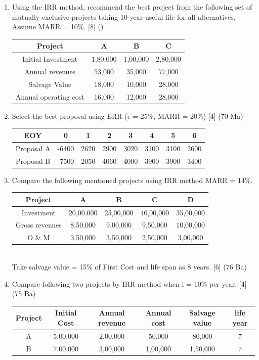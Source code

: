 \documentclass[12pt]{article}
\begin{document}
\begin{enumerate}
		\item Using the IRR method, recommend the best project from the following set of mutually exclusive projects taking 10-year useful life for all alternatives. Assume MARR = 10\%. \hfill [8] ()\\
		\begin{tabular}{|c|c|c|c|}
			\hline
			Project & A & B & C \\ \hline
			Initial Investment & 1,80,000 & 1,00,000 & 2,80,000 \\ \hline
			Annual revenues & 53,000 & 35,000 & 77,000 \\ \hline
			Salvage Value & 18,000 & 10,000 & 28,000 \\ \hline
			Annual operating cost & 16,000 & 12,000 & 28,000 \\ \hline
		\end{tabular}
		
		\item Select the best proposal using ERR ($\epsilon$ = 25\%, MARR = 20\%) \hfill [4] (70 Ma)\\
		\begin{tabular}{|c|c|c|c|c|c|c|c|}
			\hline
			EOY & 0 & 1 & 2 & 3 & 4 & 5 & 6 \\ \hline
			Proposal A & -6400 & 2620 & 2900 & 3020 & 3100 & 3100 & 2600 \\ \hline
			Proposal B & -7500 & 2050 & 4060 & 4000 & 3900 & 3900 & 3400 \\ \hline
		\end{tabular}
		
		\item Compare the following mentioned projects using IRR method MARR = 14\%. \\
		\begin{tabular}{|c|c|c|c|c|}
			\hline
			Project & A & B & C & D\\ \hline
			Investment & 20,00,000 & 25,00,000 & 40,00,000 & 35,00,000\\ \hline
			Gross revenues & 8,50,000 & 9,00,000 & 9,50,000 & 10,00,000\\ \hline
			O \& M & 3,50,000 & 3,50,000 & 2,50,000 & 3,00,000 \\ \hline
		\end{tabular}\\
		Take salvage value = 15\% of First Cost and life span as 8 years. \hfill [6] (76 Ba)
		
		\item Compare following two projects by IRR method when i = 10\% per year. \hfill [4] (75 Ba)\\
		\begin{tabular}{|c|c|c|c|c|c|}
			\hline
			Project & Initial Cost & Annual revenue & Annual cost & Salvage value & life year\\ \hline
			A & 5,00,000 & 2,00,000 & 50,000 & 80,000 & 7 \\ \hline
			B & 7,00,000 & 3,00,000 & 1,00,000 & 1,50,000 & 7 \\ \hline
		\end{tabular}
		

\end{enumerate}
\end{document}
